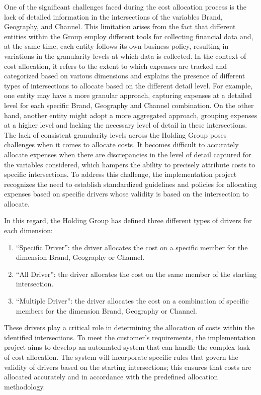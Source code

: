 \documentclass[12pt,a4paper,openright,twoside]{book}
\begin{document}
One of the significant challenges faced during the cost allocation process is the lack of detailed information in the intersections of the variables Brand, Geography, and Channel.
%
This limitation arises from the fact that different entities within the Group employ different tools for collecting financial data and, at the same time, each entity follows its own business policy, resulting in variations in the granularity levels at which data is collected.
%
In the context of cost allocation, it refers to the extent to which expenses are tracked and categorized based on various dimensions and explains the presence of different types of intersections to allocate based on the different detail level.
%
For example, one entity may have a more granular approach, capturing expenses at a detailed level for each specific Brand, Geography and Channel combination. 
%
On the other hand, another entity might adopt a more aggregated approach, grouping expenses at a higher level and lacking the necessary level of detail in these intersections.
%
The lack of consistent granularity levels across the Holding Group poses challenges when it comes to allocate costs.
%
It becomes difficult to accurately allocate expenses when there are discrepancies in the level of detail captured for the variables considered, which hampers the ability to precisely attribute costs to specific intersections.
%
To address this challenge, the implementation project recognizes the need to establish standardized guidelines and policies for allocating expenses based on specific drivers whose validity is based on the intersection to allocate.

In this regard, the Holding Group has defined three different types of drivers for each dimension:

\begin{enumerate}
    \item ``Specific Driver'': the driver allocates the cost on a specific member for the dimension Brand, Geography or Channel.
    \item ``All Driver'': the driver allocates the cost on the same member of the starting intersection.
    \item ``Multiple Driver'': the driver allocates the cost on a combination of specific members for the dimension Brand, Geography or Channel.
\end{enumerate}

These drivers play a critical role in determining the allocation of costs within the identified intersections.
To meet the customer's requirements, the implementation project aims to develop an automated system that can handle the complex task of cost allocation. 
%
The system will incorporate specific rules that govern the validity of drivers based on the starting intersections; this ensures that costs are allocated accurately and in accordance with the predefined allocation methodology.
\end{document}
